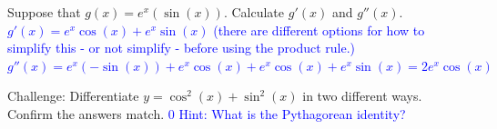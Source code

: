 \documentclass{ximera}
\begin{document}
\begin{exercise}
    Suppose that $g(x)=e^x(\sin(x))$.  Calculate $g'(x)$ and $g''(x)$. \\
    \textcolor{blue}{ $g'(x)=e^x\cos(x)+e^x\sin(x)$ (there are different options for how to simplify this - or not simplify - before using the product rule.)\\
    $g''(x)=e^x(-\sin(x))+e^x\cos(x)+e^x\cos(x)+e^x\sin(x)=2e^x\cos(x)$}
\end{exercise}  
   

\begin{exercise}
    Challenge: Differentiate $y=\cos^2(x)+\sin^2(x)$ in two different ways.  Confirm the answers match. \textcolor{blue}{ $0$ Hint: What is the Pythagorean identity? }
\end{exercise}
\end{document}
